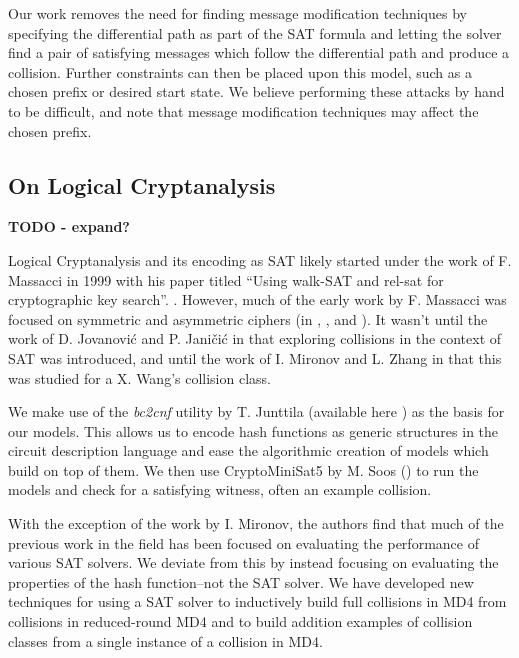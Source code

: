 \documentclass[conference]{IEEEtran}
\begin{document}
Our work removes the need for finding message modification techniques by
specifying the differential path as part of the SAT formula and letting the
solver find a pair of satisfying messages which follow the differential path
and produce a collision. Further constraints can then be placed upon this
model, such as a chosen prefix or desired start state. We believe performing
these attacks by hand to be difficult, and note that message modification
techniques may affect the chosen prefix.


\subsection{On Logical Cryptanalysis}

\textbf{TODO - expand?}

Logical Cryptanalysis and its encoding as SAT likely started under the work of
F. Massacci in 1999 with his paper titled ``Using walk-SAT and rel-sat for
cryptographic key search''. \cite{Massacci:1999:UWR:1624218.1624261}. However,
much of the early work by F. Massacci was focused on symmetric and asymmetric
ciphers (in \cite{Massacci:1999:UWR:1624218.1624261},
\cite{MASSACCI2000LogicalCA}, and \cite{FIORINI2003101}). It wasn't until the
work of D. Jovanovi{\'{c}} and P. Jani{\v{c}}i{\'{c}} in \cite{LogicalAnalysis}
that exploring collisions in the context of SAT was introduced, and until
the work of I. Mironov and L. Zhang in \cite{Mironov2006} that this was
studied for a X. Wang's collision class.

We make use of the \textit{bc2cnf} utility by T. Junttila (available here
\cite{circuits}) as the basis for our models. This allows us to encode hash
functions as generic structures in the circuit description language and
ease the algorithmic creation of models which build on top of them. We then
use CryptoMiniSat5 by M. Soos (\cite{CryptoMiniSat5}) to run the models and
check for a satisfying witness, often an example collision.

With the exception of the work by I. Mironov, the authors find that much of
the previous work in the field has been focused on evaluating the performance
of various SAT solvers. We deviate from this by instead focusing on evaluating
the properties of the hash function--not the SAT solver. We have developed new
techniques for using a SAT solver to inductively build full collisions in MD4
from collisions in reduced-round MD4 and to build addition examples of
collision classes from a single instance of a collision in MD4.
\end{document}
